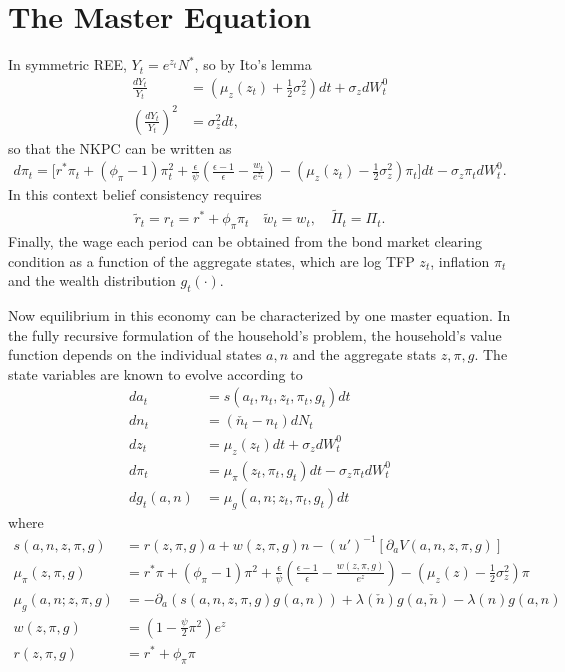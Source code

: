 \documentclass[notitlepage,a4paper,11pt]{report}
\numberwithin{section}{chapter}
\numberwithin{subsection}{section}
\begin{document}
\pagebreak


\section{The Master Equation}

In symmetric REE, $Y_t = e^{z_t} N^*$, so by Ito's lemma 
\begin{align*}
\frac{dY_t}{Y_t} & = \left( \mu_z(z_t)  + \frac{1}{2} \sigma_z^2 \right) dt + \sigma_z dW_t^0 \\[10pt]
\left( \frac{dY_t}{Y_t}  \right)^2 & = \sigma_z^2 dt, 
\end{align*}
so that the NKPC can be written as 
\begin{align*}
d \pi_t = \Bigg[ r^* \pi_t + (\phi_{\pi} -1)\pi_t^2 +  \frac{\epsilon}{\psi} \left( \frac{\epsilon-1}{\epsilon} - \frac{w_t}{e^{z_t}} \right) - \left( \mu_z(z_t) - \frac{1}{2} \sigma_z^2 \right) \pi_t \Bigg] dt - \sigma_z \pi_t dW_t^0. 
\end{align*}
In this context belief consistency requires 
\begin{align*}
\tilde{r}_t = r_t = r^* + \phi_{\pi} \pi_t  \quad \tilde{w}_t = w_t, \quad \tilde{\Pi}_t = \Pi_t. 
\end{align*}
Finally, the wage each period can be obtained from the bond market clearing condition as a function of the aggregate states, which are log TFP $z_t$, inflation $\pi_t$ and the wealth distribution $g_t(\cdot)$. 

Now equilibrium in this economy can be characterized by one master equation. In the fully recursive formulation of the household's problem, the household's value function depends on the individual states $a,n$ and the aggregate stats $z, \pi, g$. The state variables are known to evolve according to 
\begin{align*}
d a_t & = s(a_t, n_t, z_t, \pi_t, g_t) dt \\[10pt]
d n_t & = \left( \check{n_t} - n_t \right) dN_t \\[10pt]
dz_t & = \mu_z(z_t) dt + \sigma_z dW_t^0 \\[10pt]
d \pi_t & = \mu_{\pi} \left( z_t, \pi_t, g_t \right) dt - \sigma_z \pi_t dW_t^0 \\[10pt]
d g_t(a,n) & = \mu_g ( a,n ; z_t, \pi_t, g_t) dt 
\end{align*}
where
\begin{align*}
s(a,n, z,\pi, g) & = r(z,\pi,g) a + w(z,\pi,g) n - (u')^{-1} \left[ \partial_a V(a,n,z, \pi,g) \right] \\[10pt]
\mu_{\pi}( z,\pi, g) & = r^* \pi + (\phi_{\pi} - 1) \pi^2 + \frac{\epsilon}{\psi} \left( \frac{\epsilon-1}{\epsilon} - \frac{w(z,\pi,g) }{e^{z}} \right)  -  \left( \mu_z(z) - \frac{1}{2} \sigma_z^2 \right) \pi \\[10pt]
\mu_g ( a,n ; z, \pi, g)  & =  - \partial_a \left( s(a,n, z, \pi, g) g(a,n) \right) + \lambda(\check{n}) g(a,\check{n} ) - \lambda(n) g(a,n) \\[10pt]
w(z,\pi,g) & = \left( 1 - \frac{\psi}{2} \pi^2 \right) e^z  \\[10pt]
r(z,\pi,g) & = r^* + \phi_{\pi} \pi 
\end{align*}
\end{document}
